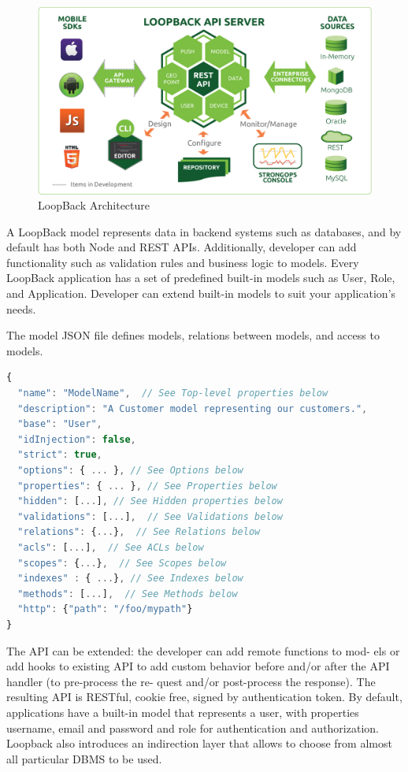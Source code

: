 \begin {figure}[h]
\graphicspath{{images/chapter_TCH/}}
\includegraphics[width=\textwidth]{loopback_1}
\caption{LoopBack Architecture}
\end {figure}



A LoopBack model represents data in backend systems such as databases, and by default has both Node and REST APIs.  Additionally, developer can add functionality such as validation rules and business logic to models.
Every LoopBack application has a set of predefined built-in models such as User, Role, and Application.  Developer can extend built-in models to suit your application's needs.

The model JSON file defines models, relations between models, and access to models. 

\begin{lstlisting}[language=javascript]
{
  "name": "ModelName",  // See Top-level properties below
  "description": "A Customer model representing our customers.",
  "base": "User",
  "idInjection": false,
  "strict": true,
  "options": { ... }, // See Options below
  "properties": { ... }, // See Properties below
  "hidden": [...], // See Hidden properties below
  "validations": [...],  // See Validations below
  "relations": {...},  // See Relations below
  "acls": [...],  // See ACLs below
  "scopes": {...},  // See Scopes below
  "indexes" : { ...}, // See Indexes below
  "methods": [...],  // See Methods below 
  "http": {"path": "/foo/mypath"}
}
\end{lstlisting}

The API can be extended: the developer can add remote functions to mod- els or add hooks to existing API to add custom behavior before and/or after the API handler (to pre-process the re- quest and/or post-process the response). The resulting API is RESTful, cookie free, signed by authentication token. By default, applications have a built-in model that represents a user, with properties username, email and password and role for authentication and authorization. Loopback also introduces an indirection layer that allows to choose from almost all particular DBMS to be used.
